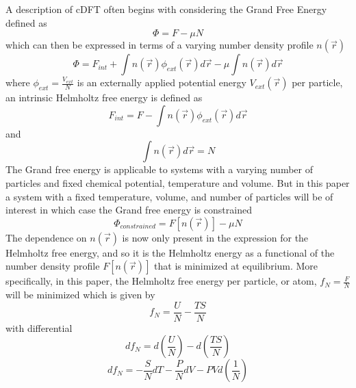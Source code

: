 \documentclass[double,12pt]{beavtex}
\begin{document}
A description of cDFT often begins with considering the Grand Free 
Energy defined as
\begin{equation}\Phi=F-\mu{N}\end{equation}
which can then be expressed in terms of a varying number density 
profile $n(\vec r)$
\begin{equation}\label{GrandFE}\Phi= F_{int} +\int n(\vec{r})\phi_{ext}{(\vec r)}d\vec{r}-\mu\int n(\vec r)d\vec{r}\end{equation}
where $\phi_{ext}=\frac{V_{ext}}{N}$ is an externally applied potential energy 
$V_{ext}(\vec r)$ per particle, an intrinsic Helmholtz free energy 
is defined as
\begin{equation}F_{int} = F - \int n(\vec{r})\phi_{ext}{(\vec r)}d\vec{r}\end{equation}  
and 
\begin{equation}\int n(\vec r)d\vec{r}=N\end{equation}%
The Grand free energy is applicable to systems with a varying number of 
particles and fixed chemical potential, temperature and volume. But in 
this paper a system with a fixed temperature, volume, and number of 
particles will be of interest in which case
the Grand free energy is constrained
\begin{equation}\label{GrandFE}\Phi_{constrained}= F[n(\vec r)]-\mu N\end{equation}
The dependence on $n(\vec r)$ is now only present in the expression for 
the Helmholtz free energy, and so it is the Helmholtz energy as a functional 
of the number density profile $F[n(\vec r)]$ that is minimized at equilibrium. 
More specifically, in this paper, the Helmholtz free energy per particle, 
or atom,  $f_N=\frac{F}{N}$ will be minimized which is given by
\begin{equation}f_N=\frac{U}{N}-\frac{TS}{N}\end{equation}
with differential
\begin{equation}\label{usetoshowmin}df_N=d\left(\frac{U}{N}\right)-d\left(\frac{TS}{N}\right)\end{equation}
\begin{equation}df_N=-\frac{S}{N}dT-\frac{P}{N}dV-PVd\left(\frac{1}{N}\right)\end{equation}
\end{document}
